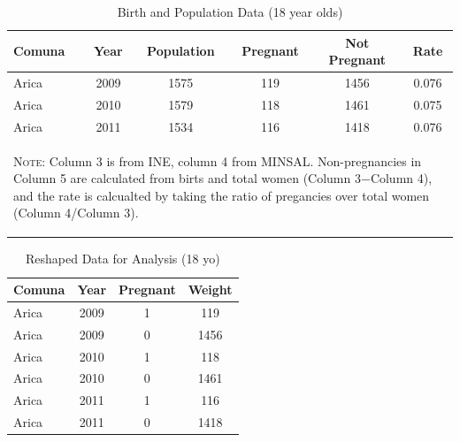 \documentclass[11pt,subeqn]{article}
\begin{document}
\begin{spacing}{1}
\begin{table}[htpb!]
\begin{center}
\caption{Birth and Population Data (18 year olds)}
\label{strucTab}
\begin{tabular}{lccccc} \toprule
Comuna & Year & Population & Pregnant & Not Pregnant & Rate \\ \midrule
Arica & 2009 & 1575 & 119 & 1456 & 0.076 \\
Arica & 2010 & 1579 & 118 & 1461 & 0.075 \\ 
Arica & 2011 & 1534 & 116 & 1418 & 0.076 \\ \bottomrule
\multicolumn{6}{p{11.2cm}}{\begin{footnotesize}\textsc{Note:} Column 3 is from INE, 
column 4 from MINSAL. Non-pregnancies in Column 5 are calculated from birts and
total women (Column 3$-$Column 4), and the rate is calcualted by taking the ratio
of pregancies over total women (Column 4/Column 3).\end{footnotesize}}
\end{tabular}
\end{center}
\end{table}

\begin{table}[htpb!]
\begin{center}
\caption{Reshaped Data for Analysis (18 yo)}
\label{reshapeTab}
\begin{tabular}{lccc} \toprule
Comuna & Year & Pregnant & Weight \\ \midrule
Arica & 2009 & 1 & 119 \\
Arica & 2009 & 0 & 1456 \\
Arica & 2010 & 1 & 118 \\
Arica & 2010 & 0 & 1461 \\
Arica & 2011 & 1 & 116 \\
Arica & 2011 & 0 & 1418 \\ \bottomrule
\end{tabular} \\
\end{center}
\end{table}
\end{spacing}
\end{document}
